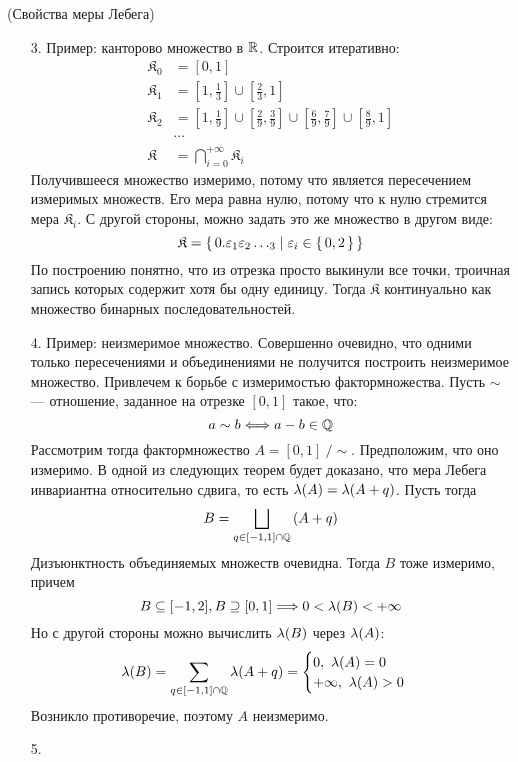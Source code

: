 \begin{theorem}(Свойства меры Лебега)
    \begin{itemize}
        \item[3.] Пример: канторово множество в $\mathbb{R}$. Строится итеративно:
\begin{align*}
	\mathfrak{K}_0 &= \left[0, 1\right] \\
	\mathfrak{K}_1 &= \left[1, \frac{1}{3}\right] \cup \left[\frac{2}{3}, 1\right]\\
	\mathfrak{K}_2 &= \left[1, \frac{1}{9}\right] \cup \left[\frac{2}{9}, \frac{3}{9}\right]
		\cup \left[\frac{6}{9}, \frac{7}{9}\right] \cup \left[\frac{8}{9}, 1\right]
			   \\	&\cdots \\
	\mathfrak{K} &= \bigcap_{i = 0}^{+\infty}{\mathfrak{K}_i}
\end{align*}
		Получившееся множество измеримо, потому что является пересечением измеримых
		множеств. Его мера равна нулю, потому что к нулю стремится мера
		$\mathfrak{K}_i$. С другой стороны, можно задать это же множество в другом виде:
\[
	\mathfrak{K} = \{\, 0.\varepsilon_1\varepsilon_2\ldots_3  \mid \varepsilon_i \in \{\,0,2\,\}  \,\}
\]
		По построению понятно, что из отрезка просто выкинули все точки, троичная запись
		которых содержит хотя бы одну единицу. Тогда $\mathfrak{K}$ континуально
		как множество бинарных последовательностей.
        \item[4.] Пример: неизмеримое множество. Совершенно очевидно, что одними
			только пересечениями и объединениями не получится построить неизмеримое множество.
			Привлечем к борьбе с измеримостью фактормножества. Пусть $\sim$ --- отношение,
			заданное на отрезке $[0, 1]$ такое, что:
\[
	a \sim b \Longleftrightarrow a - b \in \mathbb{Q}
\]
		Рассмотрим тогда фактормножество $A = [0, 1] ~/ \sim$. Предположим, что оно
		измеримо. В одной из следующих теорем будет доказано, что мера Лебега инвариантна
		относительно сдвига, то есть $\lambda(A) = \lambda(A + q)$. Пусть тогда
\[
	B = \bigsqcup_{q \in [-1, 1] \cap \mathbb{Q}}{\left(A + q\right)}
\]
		Дизъюнктность объединяемых множеств очевидна. Тогда $B$ тоже измеримо, причем
\[
	B \subseteq [-1, 2], B \supseteq [0, 1] \Longrightarrow 0 < \lambda(B) < +\infty
\]
		Но с другой стороны можно вычислить $\lambda(B)$ через $\lambda(A)$:
\[
	\lambda(B) = \sum_{q \in [-1, 1] \cap \mathbb{Q}}{\lambda(A + q)} = \begin{cases}
		0,~ \lambda(A) = 0 \\
		+\infty,~ \lambda(A) > 0
	\end{cases}
\]
		Возникло противоречие, поэтому $A$ неизмеримо.
	    \item[5.] \begin{itemize}

\end{itemize}
\end{itemize}
\end{theorem}
